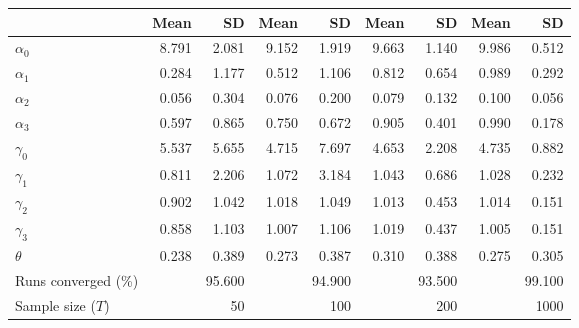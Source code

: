 
\begin{tabular}[t]{lrrrrrrrr}
\toprule
  & Mean & SD & Mean  & SD  & Mean   & SD   & Mean    & SD   \\
\midrule
$\alpha_{0}$ & 8.791 & 2.081 & 9.152 & 1.919 & 9.663 & 1.140 & 9.986 & 0.512\\
$\alpha_{1}$ & 0.284 & 1.177 & 0.512 & 1.106 & 0.812 & 0.654 & 0.989 & 0.292\\
$\alpha_{2}$ & 0.056 & 0.304 & 0.076 & 0.200 & 0.079 & 0.132 & 0.100 & 0.056\\
$\alpha_{3}$ & 0.597 & 0.865 & 0.750 & 0.672 & 0.905 & 0.401 & 0.990 & 0.178\\
$\gamma_{0}$ & 5.537 & 5.655 & 4.715 & 7.697 & 4.653 & 2.208 & 4.735 & 0.882\\
$\gamma_{1}$ & 0.811 & 2.206 & 1.072 & 3.184 & 1.043 & 0.686 & 1.028 & 0.232\\
$\gamma_{2}$ & 0.902 & 1.042 & 1.018 & 1.049 & 1.013 & 0.453 & 1.014 & 0.151\\
$\gamma_{3}$ & 0.858 & 1.103 & 1.007 & 1.106 & 1.019 & 0.437 & 1.005 & 0.151\\
$\theta$ & 0.238 & 0.389 & 0.273 & 0.387 & 0.310 & 0.388 & 0.275 & 0.305\\
Runs converged (\%) &  & 95.600 &  & 94.900 &  & 93.500 &  & 99.100\\
Sample size ($T$) &  & 50 &  & 100 &  & 200 &  & 1000\\
\bottomrule
\end{tabular}

